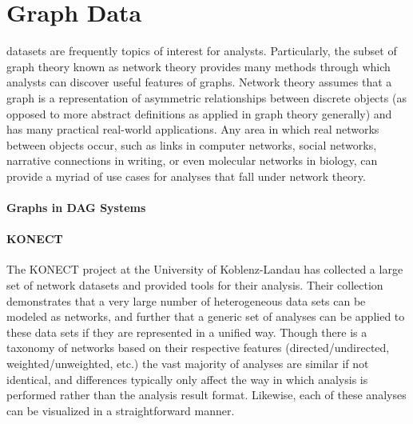 \section{Graph Data}
\label{sec:graph_data}
 datasets are frequently topics of interest for analysts. Particularly, the subset of graph theory known as network theory provides many methods through which analysts can discover useful features of graphs. Network theory assumes that a graph is a representation of asymmetric relationships between discrete objects (as opposed to more abstract definitions as applied in graph theory generally) and has many practical real-world applications. Any area in which real networks between objects occur, such as links in computer networks, social networks, narrative connections in writing,  or even molecular networks in biology, can provide a myriad of use cases for analyses that fall under network theory. 

\paragraph{Graphs in DAG Systems}

\paragraph{KONECT}
The KONECT project \cite{Kunegis2013} at the University of Koblenz-Landau has collected a large set of network datasets and provided tools for their analysis. Their collection demonstrates that a very large number of heterogeneous data sets can be modeled as networks, and further that a generic set of analyses can be applied to these data sets if they are represented in a unified way. Though there is a taxonomy of networks based on their respective features (directed/undirected, weighted/unweighted, etc.) the vast majority of analyses are similar if not identical, and differences typically only affect the way in which analysis is performed rather than the analysis result format. Likewise, each of these analyses can be visualized in a straightforward manner.

